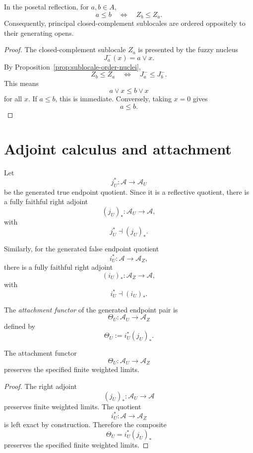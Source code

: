 \begin{proposition}
\label{prop:order-principal-closed-complements}
In the posetal reflection, for \(a,b\in A\),
\[
    a\leq b
    \quad\Longleftrightarrow\quad
    Z_b\leq Z_a.
\]
Consequently, principal closed-complement sublocales are ordered oppositely to
their generating opens.
\end{proposition}

\begin{proof}
The closed-complement sublocale \(Z_a\) is presented by the fuzzy nucleus
\[
    J_a^-(x)=a\vee x.
\]
By Proposition~\ref{prop:sublocale-order-nuclei},
\[
    Z_b\leq Z_a
    \quad\Longleftrightarrow\quad
    J_a^-\leq J_b^-.
\]
This means
\[
    a\vee x\leq b\vee x
\]
for all \(x\).  If \(a\leq b\), this is immediate.  Conversely, taking \(x=0\)
gives
\[
    a\leq b.
\]
\end{proof}

\section{Adjoint calculus and attachment}
\label{sec:adjoint-calculus-and-attachment-corrected}

Let
\[
    j_U^\ast:\mathcal A\to\mathcal A_U
\]
be the generated true endpoint quotient.  Since it is a reflective quotient,
there is a fully faithful right adjoint
\[
    (j_U)_\ast:\mathcal A_U\to\mathcal A,
\]
with
\[
    j_U^\ast\dashv(j_U)_\ast.
\]

Similarly, for the generated false endpoint quotient
\[
    i_U^\ast:\mathcal A\to\mathcal A_Z,
\]
there is a fully faithful right adjoint
\[
    (i_U)_\ast:\mathcal A_Z\to\mathcal A,
\]
with
\[
    i_U^\ast\dashv(i_U)_\ast.
\]

\begin{definition}
\label{def:fuzzy-attachment-functor}
The \emph{attachment functor} of the generated endpoint pair is
\[
    \Theta_U:\mathcal A_U\to\mathcal A_Z
\]
defined by
\[
    \Theta_U:=i_U^\ast (j_U)_\ast.
\]
\end{definition}

\begin{proposition}
\label{prop:attachment-left-exact}
The attachment functor
\[
    \Theta_U:\mathcal A_U\to\mathcal A_Z
\]
preserves the specified finite weighted limits.
\end{proposition}

\begin{proof}
The right adjoint
\[
    (j_U)_\ast:\mathcal A_U\to\mathcal A
\]
preserves finite weighted limits.  The quotient
\[
    i_U^\ast:\mathcal A\to\mathcal A_Z
\]
is left exact by construction.  Therefore the composite
\[
    \Theta_U=i_U^\ast(j_U)_\ast
\]
preserves the specified finite weighted limits.
\end{proof}

